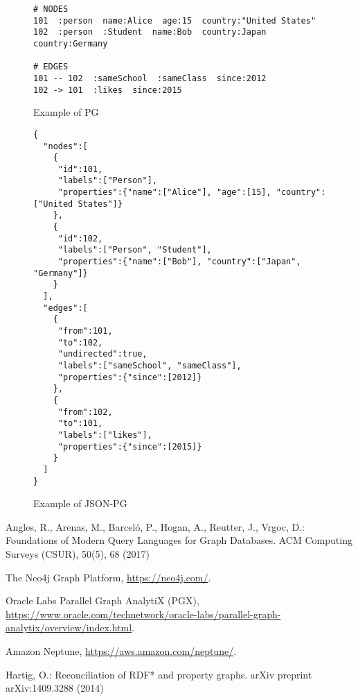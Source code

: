 \documentclass[runningheads]{llncs}
\begin{document}
\begin{figure}[!t]
\begin{scriptsize}
\begin{verbatim}
# NODES
101  :person  name:Alice  age:15  country:"United States"
102  :person  :Student  name:Bob  country:Japan  country:Germany

# EDGES
101 -- 102  :sameSchool  :sameClass  since:2012
102 -> 101  :likes  since:2015
\end{verbatim}
\end{scriptsize}
\caption{Example of PG}
\label{fig:example-pg}
\end{figure}

\begin{figure}[!t]
\begin{scriptsize}
\begin{verbatim}
{
  "nodes":[
    {
     "id":101,
     "labels":["Person"],
     "properties":{"name":["Alice"], "age":[15], "country":["United States"]}
    },
    {
     "id":102,
     "labels":["Person", "Student"],
     "properties":{"name":["Bob"], "country":["Japan", "Germany"]}
    }
  ],
  "edges":[
    {
     "from":101,
     "to":102,
     "undirected":true,
     "labels":["sameSchool", "sameClass"],
     "properties":{"since":[2012]}
    },
    {
     "from":102,
     "to":101,
     "labels":["likes"],
     "properties":{"since":[2015]}
    }
  ]
}
\end{verbatim}
\end{scriptsize}
\caption{Example of JSON-PG}
\label{fig:example-json}
\end{figure}



%
%
%
% 
% 
%
\begin{thebibliography}{8}

Angles, R., Arenas, M., Barceló, P., Hogan, A., Reutter, J., Vrgoc, D.: Foundations of Modern Query Languages for Graph Databases. ACM Computing Surveys (CSUR), 50(5), 68 (2017)

The Neo4j Graph Platform, \url{https://neo4j.com/}.

Oracle Labs Parallel Graph AnalytiX (PGX), \url{https://www.oracle.com/technetwork/oracle-labs/parallel-graph-analytix/overview/index.html}.

Amazon Neptune, \url{https://aws.amazon.com/neptune/}.

Hartig, O.: Reconciliation of RDF* and property graphs. arXiv preprint arXiv:1409.3288 (2014)

\end{thebibliography}
\end{document}
